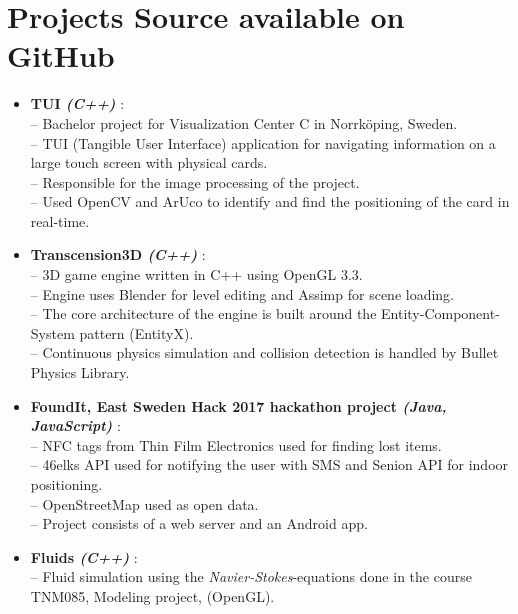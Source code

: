 \documentclass[letterpaper,11pt]{article}
\newcommand{\resumeItem}[2]{
  \item\small{
    \textbf{#1}{: #2 \vspace{-2pt}}
  }
}
\newcommand{\resumeSubItem}[2]{\resumeItem{#1}{#2}\vspace{-4pt}}
\newcommand{\resumeSubHeadingListStart}{\begin{itemize}[leftmargin=*]}
\newcommand{\resumeSubHeadingListEnd}{\end{itemize}}
\begin{document}
\section{Projects Source available on GitHub}
  \resumeSubHeadingListStart
    \resumeSubItem{\textmu{}TUI \textit{(C++)} }
      { \\
      \indent-- Bachelor project for Visualization Center C in Norrköping, Sweden. \\
      \indent-- TUI (Tangible User Interface) application for navigating information on a large touch screen with physical cards.\\
      \indent-- Responsible for the image processing of the project.\\
      \indent-- Used OpenCV and ArUco to identify and find the positioning of the card in real-time.\\}
      
    \resumeSubItem{Transcension3D \textit{(C++)} }
      { \\ 
      \indent-- 3D game engine written in C++ using OpenGL 3.3. \\
      \indent-- Engine uses Blender for level editing and Assimp for scene loading. \\
      \indent-- The core architecture of the engine is built around the Entity-Component-System pattern (EntityX). \\
      \indent-- Continuous physics simulation and collision detection is handled by Bullet Physics Library.}
      
      \resumeSubItem{FoundIt, East Sweden Hack 2017 hackathon project \textit{(Java, JavaScript)} }
      { \\ 
      \indent-- NFC tags from Thin Film Electronics used for finding lost items.\\
      \indent-- 46elks API used for notifying the user with SMS and Senion API for indoor positioning.\\
      \indent-- OpenStreetMap used as open data.\\
      \indent-- Project consists of a web server and an Android app.\\
      }
      
    \resumeSubItem{Fluids \textit{(C++)} }
       {\\ 
       \indent-- Fluid simulation using the \textit{Navier-Stokes}-equations done in the course TNM085, Modeling project, (OpenGL).}

  \resumeSubHeadingListEnd
\end{document}
